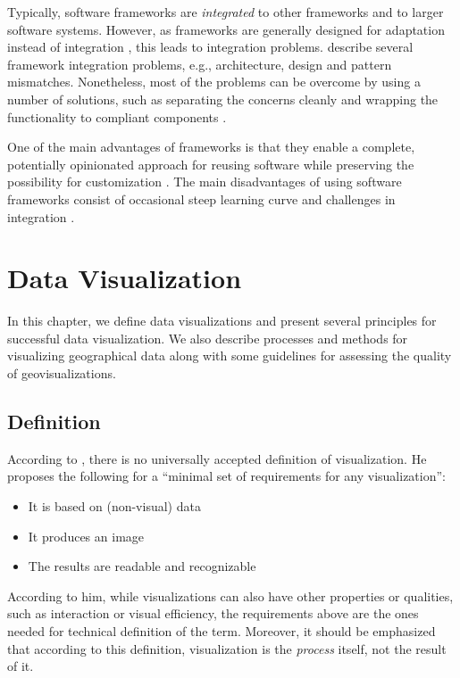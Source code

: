 Typically, software frameworks are \emph{integrated} to other frameworks and to larger software systems. However, as frameworks are generally designed for adaptation instead of integration \citep{mattsson_framework_1999}, this leads to integration problems. \citet{mattsson_framework_1999} describe several framework integration problems, e.g., architecture, design and pattern mismatches. Nonetheless, most of the problems can be overcome by using a number of solutions, such as separating the concerns cleanly and wrapping the functionality to compliant components \citep{mattsson_framework_1999}.

One of the main advantages of frameworks is that they enable a complete, potentially opinionated approach for reusing software while preserving the possibility for customization \citep{johnson_frameworkscomponents+_1997}. The main disadvantages of using software frameworks consist of occasional steep learning curve and challenges in integration \citep{fayad_object-oriented_1997}.

\chapter{Data Visualization}
\label{chapter:dataviz}

In this chapter, we define data visualizations and present several principles for successful data visualization. We also describe processes and methods for visualizing geographical data along with some guidelines for assessing the quality of geovisualizations.

\section{Definition}

According to \citet[chap.~3]{kosara_visualization_2007}, there is no universally accepted definition of visualization. He proposes the following for a ``minimal set of requirements for any visualization'':

\begin{itemize}
	\item It is based on (non-visual) data
	\item It produces an image
	\item The results are readable and recognizable
\end{itemize}

According to him, while visualizations can also have other properties or qualities, such as interaction or visual efficiency, the requirements above are the ones needed for technical definition of the term. Moreover, it should be emphasized that according to this definition, visualization is the \emph{process} itself, not the result of it.

